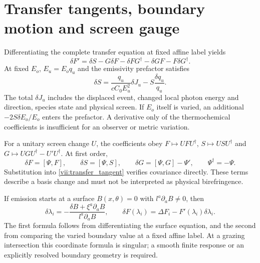 \section{Transfer tangents, boundary motion and screen gauge}
Differentiating the complete transfer equation at fixed affine label yields
\begin{equation}\label{vii:transfer_tangent}
\delta F'=\delta S-G\delta F-\delta FG^\dagger-\delta G F-F\delta G^\dagger.
\end{equation}
At fixed $E_o$, $E_u=E_oq_u$ and the emissivity prefactor satisfies
\begin{equation}\label{vii:source_tangent}
\delta S=\frac{q_u}{cC_0E_u^2}\delta J_u-S\frac{\delta q_u}{q_u}.
\end{equation}
The total $\delta J_u$ includes the displaced event, changed local photon energy and direction, species state and physical screen. If $E_o$ itself is varied, an additional $-2S\delta E_o/E_o$ enters the prefactor. A derivative only of the thermochemical coefficients is insufficient for an observer or metric variation.

For a unitary screen change $U$, the coefficients obey $F\mapsto UFU^\dagger$, $S\mapsto USU^\dagger$ and $G\mapsto UGU^\dagger-U'U^\dagger$. At first order,
\begin{equation}\label{vii:screen_gauge}
\delta F=[\Psi,F],\qquad\delta S=[\Psi,S],\qquad
\delta G=[\Psi,G]-\Psi',\qquad \Psi^\dagger=-\Psi.
\end{equation}
Substitution into \eqref{vii:transfer_tangent} verifies covariance directly. These terms describe a basis change and must not be interpreted as physical birefringence.

If emission starts at a surface $B(x,\theta)=0$ with $l^a\partial_aB\ne0$, then
\begin{equation}\label{vii:moving_boundary}
\delta\lambda_i=-\frac{\delta B+\xi^a\partial_aB}{l^a\partial_aB},\qquad
\delta F(\lambda_i)=\Delta F_i-F'(\lambda_i)\delta\lambda_i.
\end{equation}
The first formula follows from differentiating the surface equation, and the second from comparing the varied boundary value at a fixed affine label. At a grazing intersection this coordinate formula is singular; a smooth finite response or an explicitly resolved boundary geometry is required.

